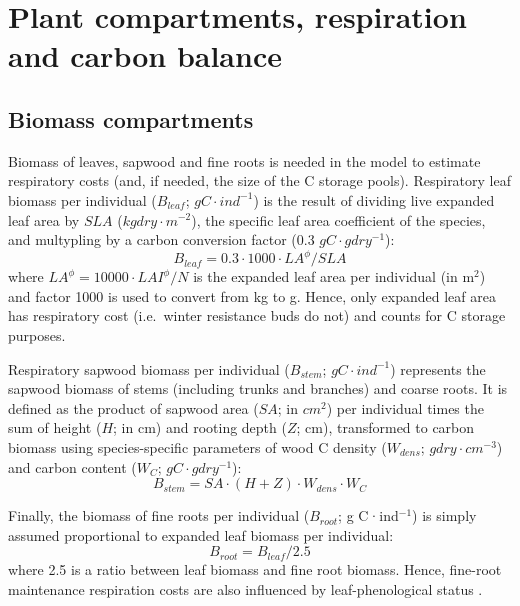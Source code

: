 \documentclass[]{book}
\begin{document}
\hypertarget{plant-compartments-respiration-and-carbon-balance}{%
\chapter{Plant compartments, respiration and carbon balance}\label{plant-compartments-respiration-and-carbon-balance}}

\hypertarget{biomass-compartments}{%
\section{Biomass compartments}\label{biomass-compartments}}

Biomass of leaves, sapwood and fine roots is needed in the model to estimate respiratory costs (and, if needed, the size of the C storage pools). Respiratory leaf biomass per individual (\(B_{leaf}\); \(g C·ind^{-1}\)) is the result of dividing live expanded leaf area by \(SLA\) (\(kg dry·m^{-2}\)), the specific leaf area coefficient of the species, and multypling by a carbon conversion factor (0.3 \(gC·g dry^{-1}\)):
\begin{equation}
B_{leaf} = 0.3 \cdot 1000 \cdot LA^{\phi} / SLA
\end{equation}
where \(LA^{\phi} = 10000 \cdot LAI^{\phi} / N\) is the expanded leaf area per individual (in m\(^2\)) and factor 1000 is used to convert from kg to g. Hence, only expanded leaf area has respiratory cost (i.e.~winter resistance buds do not) and counts for C storage purposes.

Respiratory sapwood biomass per individual (\(B_{stem}\); \(g C·ind^{-1}\)) represents the sapwood biomass of stems (including trunks and branches) and coarse roots. It is defined as the product of sapwood area (\(SA\); in \(cm^2\)) per individual times the sum of height (\(H\); in cm) and rooting depth (\(Z\); cm), transformed to carbon biomass using species-specific parameters of wood C density (\(W_{dens}\); \(g dry·cm^{-3}\)) and carbon content (\(W_{C}\); \(g C · g dry^{-1}\)):
\begin{equation}
B_{stem} = SA\cdot (H + Z) \cdot W_{dens} \cdot W_{C}
\end{equation}

Finally, the biomass of fine roots per individual (\(B_{root}\); g C·ind\(^{-1}\)) is simply assumed proportional to expanded leaf biomass per individual:
\begin{equation}
B_{root} = B_{leaf}/2.5
\end{equation}
where 2.5 is a ratio between leaf biomass and fine root biomass. Hence, fine-root maintenance respiration costs are also influenced by leaf-phenological status \citep{Sitch2003}.
\end{document}
